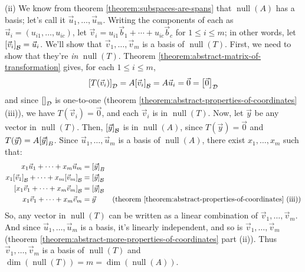\documentclass[11pt, letterpaper]{report}
\newenvironment{book}{}{}
\let\originalleft\left
\let\originalright\right
\renewcommand{\left}{\mathopen{}\mathclose\bgroup\originalleft}
\renewcommand{\right}{\aftergroup\egroup\originalright}
\newcounter{theorem}[chapter]
\DeclareMathOperator{\nul}{null}
\begin{document}
\begin{book}
(ii) We know from theorem \ref{theorem:subspaces-are-spans} that $\nul(A)$ has a basis; let's call it $\vec{u}_1,\ldots,\vec{u}_m$. Writing the components of each as $\vec{u}_i=(u_{i1},\ldots,u_{ic})$, let $\vec{v}_i=u_{i1}\vec{b}_1+\cdots+u_{ic}\vec{b}_c$ for $1\le i \le m$; in other words, let $\left[ \vec{v}_i \right]_{\mathcal{B}} = \vec{u}_i$. We'll show that $\vec{v}_1,\ldots,\vec{v}_m$ is a basis of $\nul(T)$. First, we need to show that they're \emph{in} $\nul(T)$. Theorem \ref{theorem:abstract-matrix-of-transformation} gives, for each $1\le i \le m$,
\[\left[ T(\vec{v}_i) \right]_{\mathcal{D}} = A \left[ \vec{v}_i \right]_{\mathcal{B}} = A\vec{u}_i=\vec{0} = \left[ \vec{0} \right]_{\mathcal{D}}\]
and since $\left[  \right]_{\mathcal{D}}$ is one-to-one (theorem \ref{theorem:abstract-properties-of-coordinates} (iii)), we have $T(\vec{v}_i) = \vec{0}$, and each $\vec{v}_i$ is in $\nul(T)$. Now, let $\vec{y}$ be any vector in $\nul(T)$. Then, $\left[ \vec{y} \right]_{\mathcal{B}}$ is in $\nul(A)$, since $T(\vec{y})=\vec{0}$ and $T(\vec{y})=A \left[ \vec{y} \right]_B$. Since $\vec{u}_1,\ldots,\vec{u}_m$ is a basis of $\nul(A)$, there exist $x_1,\ldots,x_m$ such that:
\begin{align*}
x_1\vec{u}_1+\cdots+x_m\vec{u}_m&=\left[ \vec{y} \right]_{B} \\
x_1 \left[ \vec{v}_1 \right]_{\mathcal{B}} + \cdots + x_m \left[ \vec{v}_m \right]_{\mathcal{B}} &= \left[ \vec{y} \right]_{\mathcal{B}} \\
\left[ x_1\vec{v}_1 + \cdots + x_m\vec{v}_m \right]_{\mathcal{B}} &= \left[ \vec{y} \right]_{\mathcal{B}} \\
x_1\vec{v}_1 + \cdots + x_m\vec{v}_m  &= \vec{y} & \text{(theorem \ref{theorem:abstract-properties-of-coordinates} (iii))} 
\end{align*}
So, any vector in $\nul(T)$ can be written as a linear combination of $\vec{v}_1,\ldots,\vec{v}_m$. And since $\vec{u}_1,\ldots,\vec{u}_m$ is a basis, it's linearly independent, and so is $\vec{v}_1,\ldots,\vec{v}_m$ (theorem \ref{theorem:abstract-more-properties-of-coordinates} part (ii)). Thus $\vec{v}_1,\ldots,\vec{v}_m$ is a basis of $\nul(T)$ and $\dim(\nul(T)) = m = \dim(\nul(A))$. \blacksquare

\end{book}
\end{document}
